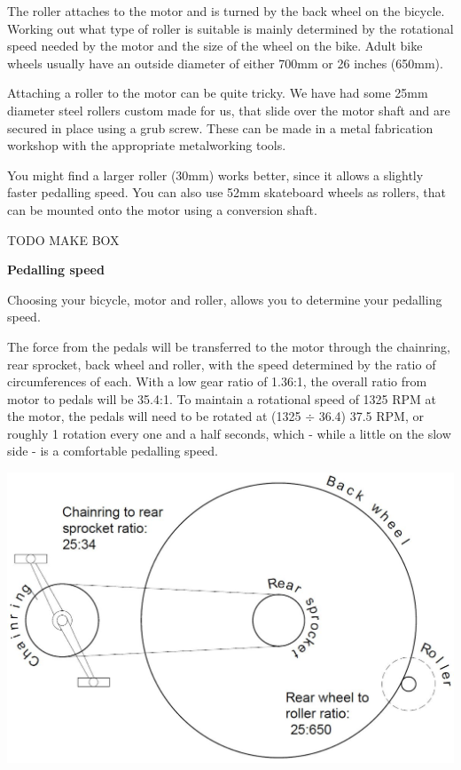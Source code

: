 \documentclass{article}
\theoremstyle{definition}
\theoremstyle{definition}
\theoremstyle{remark}
\begin{document}
    The roller attaches to the motor and is turned by the back wheel on the bicycle. Working out what type of roller is suitable is mainly determined by the rotational speed needed by the motor and the size of the wheel on the bike. Adult bike wheels usually have an outside diameter of either 700mm or 26 inches (650mm).

    Attaching a roller to the motor can be quite tricky. We have had some 25mm diameter steel rollers custom made for us, that slide over the motor shaft and are secured in place using a grub screw. These can be made in a metal fabrication workshop with the appropriate metalworking tools. 

    You might find a larger roller (30mm) works better, since it allows a slightly faster pedalling speed. You can also use 52mm skateboard wheels as rollers, that can be mounted onto the motor using a conversion shaft.

    TODO MAKE BOX

    \textbf{Pedalling speed}

    Choosing your bicycle, motor and roller, allows you to determine your pedalling speed. 

    The force from the pedals will be transferred to the motor through the chainring, rear sprocket, back wheel and roller, with the speed determined by the ratio of circumferences of each. With a low gear ratio of 1.36:1, the overall ratio from motor to pedals will be 35.4:1. To maintain a rotational speed of 1325 RPM at the motor, the pedals will need to be rotated at (1325 $\div$ 36.4) 37.5 RPM, or roughly 1 rotation every one and a half seconds, which - while a little on the slow side - is a comfortable pedalling speed.

    \begin{center}
      \includegraphics[width=0.35\paperwidth]{Images/image_3_1_(pedalling_speed).png}
    \end{center}
  
\end{document}
